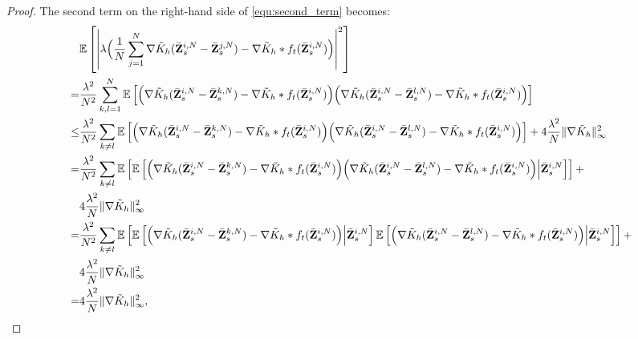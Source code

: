 \begin{proof}
The second term on the right-hand side of \eqref{equ:second_term} becomes:
\begin{equation*}
\begin{aligned}
&\mathbb E \left[\left|\lambda \Big(\frac{1}{N}\sum_{j=1}^N \nabla \tilde  K_h(\bar{\mathbf{Z}}^{i,N}_s - \bar{\mathbf{Z}}^{j,N}_s) - \nabla\tilde{K}_h*f_t(\bar{\mathbf{Z}}^{i,N}_s)  \Big) \right|^2\right] \\= &\frac{\lambda^2}{N^2}\sum_{k,l=1}^N
\mathbb E \left[\Big( \nabla \tilde  K_h(\bar{\mathbf{Z}}^{i,N}_s - \bar{\mathbf{Z}}^{k,N}_s) - \nabla\tilde{K}_h*f_t(\bar{\mathbf{Z}}^{i,N}_s)  \Big) \Big( \nabla \tilde  K_h(\bar{\mathbf{Z}}^{i,N}_s - \bar{\mathbf{Z}}^{l,N}_s) - \nabla\tilde{K}_h*f_t(\bar{\mathbf{Z}}^{i,N}_s)  \Big)\right]\\
\leq & \frac{\lambda^2}{N^2}\sum_{k\neq l}\mathbb E \left[\Big( \nabla \tilde  K_h(\bar{\mathbf{Z}}^{i,N}_s - \bar{\mathbf{Z}}^{k,N}_s) - \nabla\tilde{K}_h*f_t(\bar{\mathbf{Z}}^{i,N}_s)  \Big) \Big( \nabla \tilde  K_h(\bar{\mathbf{Z}}^{i,N}_s - \bar{\mathbf{Z}}^{l,N}_s) - \nabla\tilde{K}_h*f_t(\bar{\mathbf{Z}}^{i,N}_s)  \Big)\right] + 4\frac{\lambda^2}{N} \|\nabla\tilde{K}_h\|_\infty^2\\
=& \frac{\lambda^2}{N^2}\sum_{k\neq l}\mathbb E \left[\mathbb E \left[\Big( \nabla \tilde  K_h(\bar{\mathbf{Z}}^{i,N}_s - \bar{\mathbf{Z}}^{k,N}_s) - \nabla\tilde{K}_h*f_t(\bar{\mathbf{Z}}^{i,N}_s)  \Big) \Big( \nabla \tilde  K_h(\bar{\mathbf{Z}}^{i,N}_s - \bar{\mathbf{Z}}^{l,N}_s) - \nabla\tilde{K}_h*f_t(\bar{\mathbf{Z}}^{i,N}_s)  \Big)\Big| \bar{\mathbf{Z}}^{i,N}_s\right]\right] + \\&4\frac{\lambda^2}{N} \|\nabla\tilde{K}_h\|_\infty^2\\
=& \frac{\lambda^2}{N^2}\sum_{k\neq l}\mathbb E \left[\mathbb E \left[ \Big(\nabla \tilde  K_h(\bar{\mathbf{Z}}^{i,N}_s - \bar{\mathbf{Z}}^{k,N}_s) - \nabla\tilde{K}_h*f_t(\bar{\mathbf{Z}}^{i,N}_s) \Big)\Big| \bar{\mathbf{Z}}^{i,N}_s\right] \mathbb E \left[ \Big(\nabla \tilde  K_h(\bar{\mathbf{Z}}^{i,N}_s - \bar{\mathbf{Z}}^{l,N}_s) - \nabla\tilde{K}_h*f_t(\bar{\mathbf{Z}}^{i,N}_s) \Big)\Big| \bar{\mathbf{Z}}^{i,N}_s\right]\right] +\\
& 4\frac{\lambda^2}{N} \|\nabla\tilde{K}_h\|_\infty^2\\
= &4\frac{\lambda^2}{N} \|\nabla\tilde{K}_h\|_\infty^2,
\end{aligned}
\end{equation*}


\end{proof}
